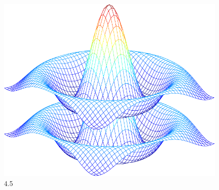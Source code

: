 \documentclass[a4paper,11pt]{article}
\begin{document}
 
\begin{figure}[!htb]
\centerline{\includegraphics[scale=0.6]{f2.pdf}}
\caption{4.5}
\label{fig:ukladPrzekaznikowy}
\end{figure}

 
\end{document}
